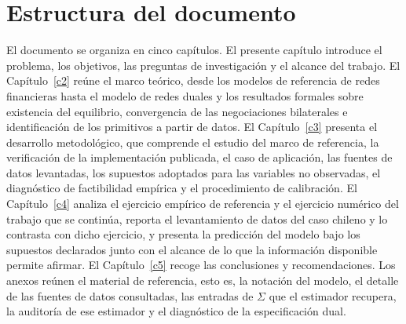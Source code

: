 \section{Estructura del documento}
\label{c1:estructura}

El documento se organiza en cinco capítulos. El presente capítulo introduce el problema, los objetivos, las preguntas de investigación y el alcance del trabajo. El Capítulo~\ref{c2} reúne el marco teórico, desde los modelos de referencia de redes financieras hasta el modelo de redes duales y los resultados formales sobre existencia del equilibrio, convergencia de las negociaciones bilaterales e identificación de los primitivos a partir de datos. El Capítulo~\ref{c3} presenta el desarrollo metodológico, que comprende el estudio del marco de referencia, la verificación de la implementación publicada, el caso de aplicación, las fuentes de datos levantadas, los supuestos adoptados para las variables no observadas, el diagnóstico de factibilidad empírica y el procedimiento de calibración. El Capítulo~\ref{c4} analiza el ejercicio empírico de referencia y el ejercicio numérico del trabajo que se continúa, reporta el levantamiento de datos del caso chileno y lo contrasta con dicho ejercicio, y presenta la predicción del modelo bajo los supuestos declarados junto con el alcance de lo que la información disponible permite afirmar. El Capítulo~\ref{c5} recoge las conclusiones y recomendaciones. Los anexos reúnen el material de referencia, esto es, la notación del modelo, el detalle de las fuentes de datos consultadas, las entradas de $\Sigma$ que el estimador recupera, la auditoría de ese estimador y el diagnóstico de la especificación dual.

